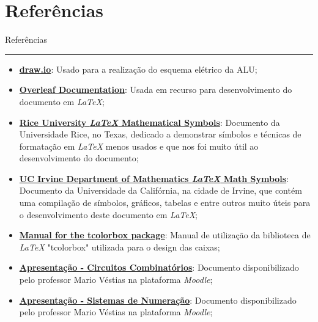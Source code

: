 \pagestyle{referencias}

\section*{Referências} \label{Referências}
{\protect\numberline{}Referências}
\hrule
\vspace{0.5cm}

\begin{itemize}
    \item \href{https://app.diagrams.net/}{\textbf{draw.io}}: Usado para a realização do esquema elétrico da ALU;
    
    \item \textbf{\href{https://www.overleaf.com/learn}{\textbf{Overleaf Documentation}}}: Usada em recurso para desenvolvimento do documento em \textit{LaTeX};
    
    \item \href{https://www.cmor-faculty.rice.edu/~heinken/latex/symbols.pdf}{\textbf{Rice University \textit{LaTeX} Mathematical Symbols}}: Documento da Universidade Rice, no Texas, dedicado a demonstrar símbolos e técnicas de formatação em \textit{LaTeX} menos usados e que nos foi muito útil ao desenvolvimento do documento;
    
    \item \href{https://www.math.uci.edu/~xiangwen/pdf/LaTeX-Math-Symbols.pdf}{\textbf{UC Irvine Department of Mathematics \textit{LaTeX} Math Symbols}}: Documento da Universidade da Califórnia, na cidade de Irvine, que contém uma compilação de símbolos, gráficos, tabelas e entre outros muito úteis para o desenvolvimento deste documento em \textit{LaTeX};

    \item  \href{https://texdoc.org/serve/tcolorbox.pdf/0}{\textbf{Manual for the tcolorbox package}}: Manual de utilização da biblioteca de \textit{LaTeX} "tcolorbox" utilizada para o design das caixas;

    \item \href{https://2425moodle.isel.pt/pluginfile.php/1254903/mod_folder/content/0/Aula%20T5%20-%20Circuitos%20Combinat%C3%B3rios.pdf?forcedownload=0}{\textbf{Apresentação - Circuitos Combinatórios}}: Documento disponibilizado pelo professor Mario Véstias na plataforma \textit{Moodle};
    
    \item \href{https://2425moodle.isel.pt/pluginfile.php/1254903/mod_folder/content/0/Aula%20T6%20-%20Sistemas%20de%20numer%C3%A7%C3%A3o.%20Aritm%C3%A9tica%20Bin%C3%A1ria.pdf?forcedownload=0}{\textbf{Apresentação - Sistemas de Numeração}}: Documento disponibilizado pelo professor Mario Véstias na plataforma \textit{Moodle};
    

\end{itemize}
